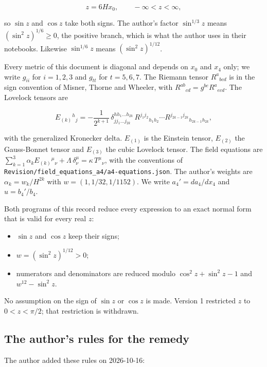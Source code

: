 \documentclass[11pt]{article}
\begin{document}
\[
z = 6Hx_0,\qquad -\infty < z < \infty ,
\]

so $\sin z$ and $\cos z$ take both signs. The author's factor $\sin^{1/3}z$ means $(\sin^2 z)^{1/6} \ge 0$, the positive branch, which is what the author uses in their notebooks. Likewise $\sin^{1/6}z$ means $(\sin^2 z)^{1/12}$.

Every metric of this document is diagonal and depends on $x_0$ and $x_4$ only; we write $g_{ii}$ for $i = 1, 2, 3$ and $g_{tt}$ for $t = 5, 6, 7$. The Riemann tensor $R^a{}_{bcd}$ is in the sign convention of Misner, Thorne and Wheeler, with $R^{ab}{}_{cd} = g^{be}R^a{}_{ecd}$. The Lovelock tensors are

\[
E_{(k)}{}^h{}_j = -\frac{1}{2^{k+1}}\,\delta^{h h_1 \dots h_{2k}}_{j j_1 \dots j_{2k}}\,R^{j_1 j_2}{}_{h_1 h_2}\cdots R^{j_{2k-1} j_{2k}}{}_{h_{2k-1} h_{2k}} ,
\]

with the generalized Kronecker delta. $E_{(1)}$ is the Einstein tensor, $E_{(2)}$ the Gauss-Bonnet tensor and $E_{(3)}$ the cubic Lovelock tensor. The field equations are $\sum_{k=1}^{3}\alpha_k E_{(k)}{}^\mu{}_\nu + \Lambda\,\delta^\mu_\nu = \kappa\,T^\mu{}_\nu$, with the conventions of \texttt{Revision\allowbreak{}/field\_e\allowbreak{}quations\allowbreak{}\_a4/a4-e\allowbreak{}quations\allowbreak{}.json}. The author's weights are $\alpha_k = w_k/H^{2k}$ with $w = (1, 1/32, 1/1152)$. We write $a_4' = da_4/dx_4$ and $u = b_4'/b_4$.

Both programs of this record reduce every expression to an exact normal form that is valid for every real $z$:

\begin{itemize}
\item $\sin z$ and $\cos z$ keep their signs;
\item $w = (\sin^2 z)^{1/12} > 0$;
\item numerators and denominators are reduced modulo $\cos^2 z + \sin^2 z - 1$ and $w^{12} - \sin^2 z$.
\end{itemize}

No assumption on the sign of $\sin z$ or $\cos z$ is made. Version 1 restricted $z$ to $0 < z < \pi/2$; that restriction is withdrawn.

\subsection{The author's rules for the remedy}

The author added these rules on 2026-10-16:
\end{document}
